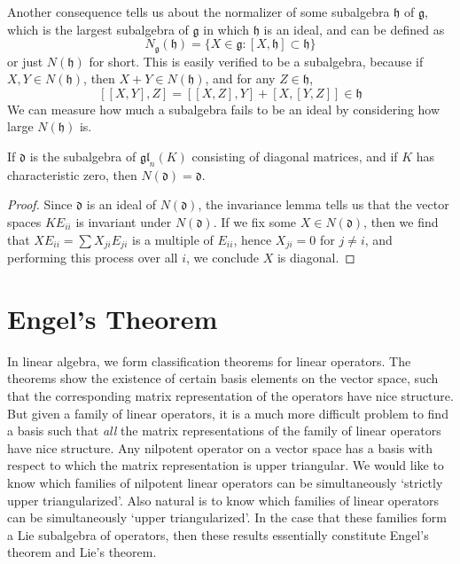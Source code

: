 Another consequence tells us about the normalizer of some subalgebra $\mathfrak{h}$ of $\mathfrak{g}$, which is the largest subalgebra of $\mathfrak{g}$ in which $\mathfrak{h}$ is an ideal, and can be defined as
%
\[ N_\mathfrak{g}(\mathfrak{h}) = \{ X \in \mathfrak{g}: [X,\mathfrak{h}] \subset \mathfrak{h} \} \]
%
or just $N(\mathfrak{h})$ for short. This is easily verified to be a subalgebra, because if $X,Y \in N(\mathfrak{h})$, then $X + Y \in N(\mathfrak{h})$, and for any $Z \in \mathfrak{h}$,
%
\[ [[X,Y], Z] = [[X,Z],Y] + [X,[Y,Z]] \in \mathfrak{h} \]
%
We can measure how much a subalgebra fails to be an ideal by considering how large $N(\mathfrak{h})$ is.

\begin{theorem}
    If $\mathfrak{d}$ is the subalgebra of $\mathfrak{gl}_n(K)$ consisting of diagonal matrices, and if $K$ has characteristic zero, then $N(\mathfrak{d}) = \mathfrak{d}$.
\end{theorem}
\begin{proof}
    Since $\mathfrak{d}$ is an ideal of $N(\mathfrak{d})$, the invariance lemma tells us that the vector spaces $K E_{ii}$ is invariant under $N(\mathfrak{d})$. If we fix some $X \in N(\mathfrak{d})$, then we find that $XE_{ii} = \sum X_{ji} E_{ji}$ is a multiple of $E_{ii}$, hence $X_{ji} = 0$ for $j \neq i$, and performing this process over all $i$, we conclude $X$ is diagonal.
\end{proof}

\section{Engel's Theorem}

In linear algebra, we form classification theorems for linear operators. The theorems show the existence of certain basis elements on the vector space, such that the corresponding matrix representation of the operators have nice structure. But given a family of linear operators, it is a much more difficult problem to find a basis such that {\it all} the matrix representations of the family of linear operators have nice structure. Any nilpotent operator on a vector space has a basis with respect to which the matrix representation is upper triangular. We would like to know which families of nilpotent linear operators can be simultaneously `strictly upper triangularized'. Also natural is to know which families of linear operators can be simultaneously `upper triangularized'. In the case that these families form a Lie subalgebra of operators, then these results essentially constitute Engel's theorem and Lie's theorem.

